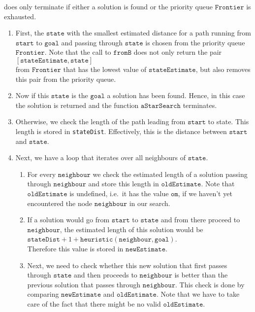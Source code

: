 does only terminate if either a solution is found or the priority queue $\mathtt{Frontier}$ is exhausted.
\begin{enumerate}
\item First, the $\mathtt{state}$ with the smallest estimated distance for a path running from $\mathtt{start}$
      to $\mathtt{goal}$ and passing through $\mathtt{state}$ is chosen from the priority queue
      $\mathtt{Frontier}$.  Note that the call to $\mathtt{fromB}$ does not only return the pair
      \\[0.2cm]
      \hspace*{1.3cm}
      $[\mathtt{stateEstimate}, \mathtt{state}]$
      \\[0.2cm]
      from $\mathtt{Frontier}$ that has the lowest value of $\mathtt{stateEstimate}$, but also removes this
      pair from the priority queue.
\item Now if this $\mathtt{state}$ is the $\mathtt{goal}$ a solution has been found.  Hence, in this case the solution is returned
      and the function $\mathtt{aStarSearch}$ terminates.
\item Otherwise, we check the length of the path leading from $\mathtt{start}$ to state.  This length is stored in
      \texttt{stateDist}.  Effectively, this is the distance between $\mathtt{start}$ and $\mathtt{state}$.
\item Next, we have a loop that iterates over all neighbours of $\mathtt{state}$.
      \begin{enumerate}
      \item For every $\mathtt{neighbour}$ we check the estimated length of a solution passing through
            $\mathtt{neighbour}$ and store this length in $\mathtt{oldEstimate}$.   Note that
            $\mathtt{oldEstimate}$ is undefined, i.e.~it has the value $\mathtt{om}$, if we haven't yet encountered the node
            $\mathtt{neighbour}$ in our search.
      \item If a solution would go from $\mathtt{start}$ to $\mathtt{state}$ and from there proceed to
            $\mathtt{neighbour}$, the estimated length of this solution would be
            \\[0.2cm]
            \hspace*{1.3cm}
            $\mathtt{stateDist} + 1 + \mathtt{heuristic}(\mathtt{neighbour}, \mathtt{goal})$.
            \\[0.2cm]
            Therefore this value is stored in $\mathtt{newEstimate}$.
      \item Next, we need to check whether this new solution that first passes through $\mathtt{state}$ and
            then proceeds to $\mathtt{neighbour}$ is better than the previous solution that passes through
            $\mathtt{neighbour}$.  This check is done by comparing $\mathtt{newEstimate}$ and
            $\mathtt{oldEstimate}$.  Note that we have to take care of the fact that there might be no valid
            $\mathtt{oldEstimate}$.


\end{enumerate}
\end{enumerate}
